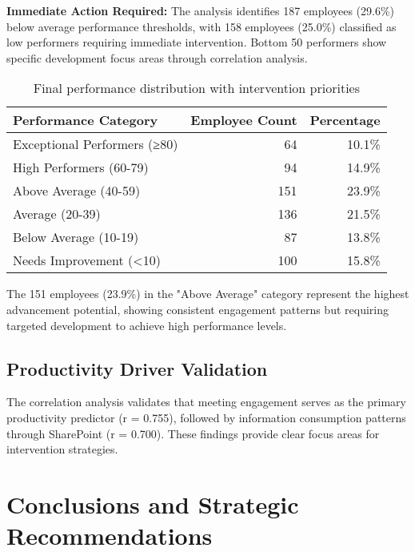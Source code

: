 \documentclass[12pt,a4paper]{article}
\begin{document}
\begin{warningbox}
\textbf{Immediate Action Required:} The analysis identifies 187 employees (29.6\%) below average performance thresholds, with 158 employees (25.0\%) classified as low performers requiring immediate intervention. Bottom 50 performers show specific development focus areas through correlation analysis.
\end{warningbox}

\begin{table}[H]
\centering
\begin{tabular}{@{}lrr@{}}
\toprule
\textbf{\color{primaryBlue}Performance Category} & \textbf{\color{primaryBlue}Employee Count} & \textbf{\color{primaryBlue}Percentage} \\
\midrule
Exceptional Performers (≥80) & 64 & 10.1\% \\
High Performers (60-79) & 94 & 14.9\% \\
Above Average (40-59) & 151 & 23.9\% \\
Average (20-39) & 136 & 21.5\% \\
Below Average (10-19) & 87 & 13.8\% \\
Needs Improvement (<10) & 100 & 15.8\% \\
\bottomrule
\end{tabular}
\caption{Final performance distribution with intervention priorities}
\end{table}

The 151 employees (23.9\%) in the "Above Average" category represent the highest advancement potential, showing consistent engagement patterns but requiring targeted development to achieve high performance levels.

\subsection{Productivity Driver Validation}

The correlation analysis validates that meeting engagement serves as the primary productivity predictor (r = 0.755), followed by information consumption patterns through SharePoint (r = 0.700). These findings provide clear focus areas for intervention strategies.



\newpage
\section{Conclusions and Strategic Recommendations}
\end{document}
